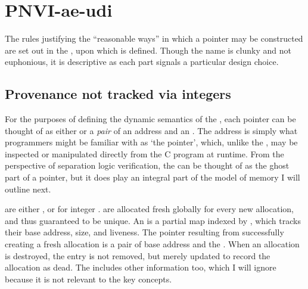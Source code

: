 \section{PNVI-ae-udi}

The rules justifying the ``reasonable ways'' in which a pointer may be
constructed are set out in the  , upon
which  is defined. Though the name is clunky and not euphonious, it is
descriptive as each part signals a particular design choice.

\subsection{Provenance not tracked via integers}

For the purposes of defining the dynamic semantics of the ,
each pointer can be thought of as either  or a \emph{pair} of an
address  and an  \sm{\pi}. The address is simply what programmers
might be familiar with as `the pointer', which, unlike the , may be
inspected or manipulated directly from the C program at runtime. From the
perspective of separation logic verification, the  can be thought of
as the ghost part of a pointer, but it does play an integral part of the model
of memory I will outline next.

 are either , or   for integer
.  are allocated fresh globally for every new allocation, and
thus guaranteed to be unique. An   is a
partial map indexed by , which tracks their base address, size,
and liveness. The pointer resulting from successfully creating a fresh
allocation is a pair of base address and the \@. When an
allocation is destroyed, the entry is not removed, but merely updated to record
the allocation as dead. The  includes other information too,
which I will ignore because it is not relevant to the key concepts.


